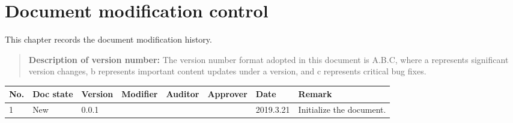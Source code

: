 \chapter*{Document modification control}

This chapter records the document modification history.

\begin{quote}
\kaishu
\textbf{Description of version number:}
The version number format adopted in this document is A.B.C, where a represents significant version changes, b represents important content updates under a version, and c represents critical bug fixes.
\end{quote}

\begin{table}[ht]
\centering
\begin{tabular}{m{1cm}<{\centering}|m{1.5cm}<{\centering}|m{1.2cm}<{\centering}|m{1.5cm}<{\centering}|m{1.5cm}<{\centering}|m{1.5cm}<{\centering}|m{1.5cm}<{\centering}|m{3cm}<{\centering}}
\hline\hline

No. & Doc state & Version & Modifier & Auditor & Approver & Date & Remark \\
\hline
1 & New & 0.0.1 &  & & & 2019.3.21 & Initialize the document. \\


\hline\hline

\end{tabular}

\end{table}
